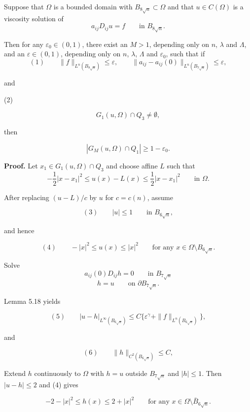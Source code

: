 \begin{lemma}\label{hanlin:ch05-lem-5-24} Suppose that $\Omega$ is a bounded domain with $B_{8\sqrt{n}} \subset \Omega$ and that
$u \in C(\Omega)$ is a viscosity solution of
\[
a_{ij}D_{ij}u = f \qquad \text{in } B_{8\sqrt{n}}.
\]

Then for any $\varepsilon_0 \in (0,1)$, there exist an $M>1$, depending only on $n$, $\lambda$ and $\Lambda$, and
an $\varepsilon \in (0,1)$, depending only on $n$, $\lambda$, $\Lambda$ and $\varepsilon_0$, such that if
\[
(1) \qquad \|f\|_{L^n(B_{8\sqrt{n}})} \leq \varepsilon,\qquad \|a_{ij}-a_{ij}(0)\|_{L^n(B_{7\sqrt{n}})} \leq \varepsilon,
\]

and

(2)

\[
G_1(u,\Omega)\cap Q_3\neq \emptyset,
\]

then

\[
|G_M(u,\Omega)\cap Q_1|\ge 1-\varepsilon_0.
\]
\end{lemma}


\noindent\textbf{Proof.} \sketch Let $x_1\in G_1(u,\Omega)\cap Q_3$ and choose affine $L$ such that
\[
-\frac12|x-x_1|^2\le u(x)-L(x)\le \frac12|x-x_1|^2 \qquad \text{in }\Omega.
\]

After replacing $(u-L)/c$ by $u$ for $c=c(n)$, assume

\[
(3)\qquad |u|\le 1 \qquad \text{in }B_{6\sqrt n},
\]

and hence

\[
(4)\qquad -|x|^2\le u(x)\le |x|^2 \qquad \text{for any }x\in \Omega\setminus B_{6\sqrt n}.
\]

Solve
\[
a_{ij}(0)D_{ij}h=0 \qquad \text{in }B_{7\sqrt n}
\]
\[
h=u \qquad \text{on }\partial B_{7\sqrt n}.
\]

Lemma 5.18 yields

\[
(5)\qquad |u-h|_{L^\infty(B_{6\sqrt n})}\le C\{\varepsilon^\gamma+\|f\|_{L^n(B_{6\sqrt n})}\},
\]

and

\[
(6)\qquad \|h\|_{C^2(B_{6\sqrt n})}\le C,
\]

Extend $h$ continuously to $\Omega$ with $h=u$ outside $B_{7\sqrt n}$ and $|h|\le1$. Then $|u-h|\le2$ and (4) gives

\[
-2-|x|^2\le h(x)\le 2+|x|^2 \qquad \text{for any }x\in \Omega\setminus \bar B_{6\sqrt n}.
\]

